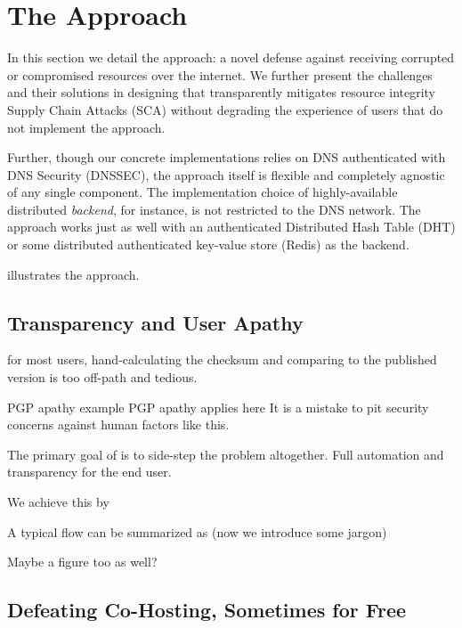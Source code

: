 \section{The \SYSTEM{} Approach} \label{sec:approach}

In this section we detail the \SYSTEM{} approach: a novel defense against
receiving corrupted or compromised resources over the internet. We further
present the challenges and their solutions in designing \SYSTEM{} that
transparently mitigates resource integrity Supply Chain Attacks (SCA) without
degrading the experience of users that do not implement the \SYSTEM{} approach.

Further, though our concrete implementations relies on DNS authenticated with
DNS Security (DNSSEC), the approach itself is flexible and completely agnostic
of any single component. The implementation choice of highly-available
distributed \emph{backend}, for instance, is not restricted to the DNS network.
The approach works just as well with an authenticated Distributed Hash Table
(DHT) or some distributed authenticated key-value store (\eg Redis) as the
backend.

 
illustrates the \SYSTEM{} approach.


\subsection{Transparency and User Apathy}

for most users, hand-calculating the checksum and comparing to the published
version is too off-path and tedious.

PGP apathy example PGP apathy applies here It is a mistake to pit security
concerns against human factors like this.

The primary goal of \SYSTEM{} is to side-step the problem altogether. Full
automation and transparency for the end user.

We achieve this by

A typical flow can be summarized as (now we introduce some jargon)

Maybe a figure too as well?

\subsection{Defeating Co-Hosting, Sometimes for Free}

